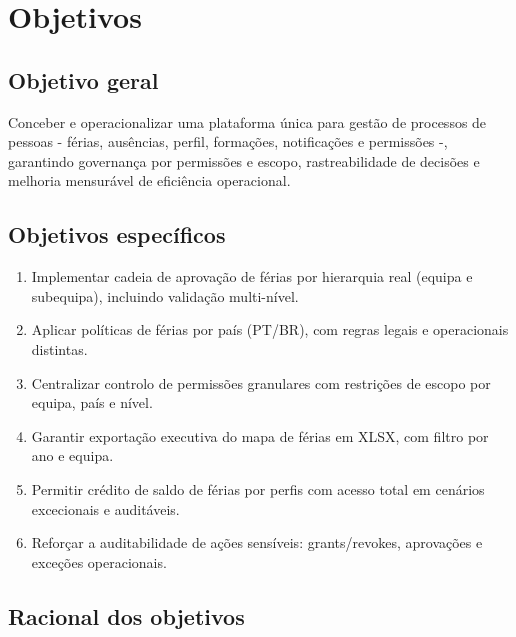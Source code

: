 \documentclass[11pt,a4paper,twoside]{article}
\begin{document}
\section{Objetivos}

\subsection{Objetivo geral}

Conceber e operacionalizar uma plataforma única para gestão de processos de pessoas - férias, ausências, perfil, formações, notificações e permissões -, garantindo governança por permissões e escopo, rastreabilidade de decisões e melhoria mensurável de eficiência operacional.

\subsection{Objetivos específicos}

\begin{enumerate}
  \item Implementar cadeia de aprovação de férias por hierarquia real (equipa e subequipa), incluindo validação multi-nível.
  \item Aplicar políticas de férias por país (PT/BR), com regras legais e operacionais distintas.
  \item Centralizar controlo de permissões granulares com restrições de escopo por equipa, país e nível.
  \item Garantir exportação executiva do mapa de férias em XLSX, com filtro por ano e equipa.
  \item Permitir crédito de saldo de férias por perfis com acesso total em cenários excecionais e auditáveis.
  \item Reforçar a auditabilidade de ações sensíveis: grants/revokes, aprovações e exceções operacionais.
\end{enumerate}

\subsection{Racional dos objetivos}
\end{document}
